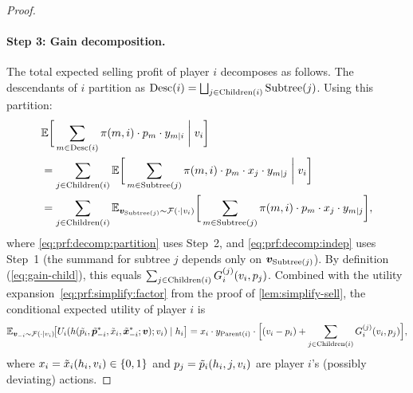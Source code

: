 \begin{proof}
\paragraph{Step 3: Gain decomposition.}
The total expected selling profit of player $i$ decomposes as follows. The descendants of $i$ partition as $\operatorname{Desc}(i) = \bigsqcup_{j \in \operatorname{Children}(i)} \operatorname{Subtree}(j)$. Using this partition:
\begin{align}
&\mathbb{E}\bigg[\sum_{m \in \operatorname{Desc}(i)} \pi(m,i) \cdot p_m \cdot y_{m \mid i} \;\bigg|\; v_i\bigg] \nonumber\\
&= \sum_{j \in \operatorname{Children}(i)} \mathbb{E}\bigg[\sum_{m \in \operatorname{Subtree}(j)} \pi(m,i) \cdot p_m \cdot x_j \cdot y_{m \mid j} \;\bigg|\; v_i\bigg] \label{eq:prf:decomp:partition}\\
&= \sum_{j \in \operatorname{Children}(i)} \mathbb{E}_{{\bm{v}}_{\operatorname{Subtree}(j)} \sim \mathcal{F}(\cdot | v_i)}\bigg[\sum_{m \in \operatorname{Subtree}(j)} \pi(m,i) \cdot p_m \cdot x_j \cdot y_{m \mid j}\bigg], \label{eq:prf:decomp:indep}
\end{align}
where \eqref{eq:prf:decomp:partition} uses Step~2, and \eqref{eq:prf:decomp:indep} uses Step~1 (the summand for subtree $j$ depends only on ${\bm{v}}_{\operatorname{Subtree}(j)}$). By definition (\cref{eq:gain-child}), this equals $\sum_{j \in \operatorname{Children}(i)} G^{(j)}_i(v_i, p_j)$. Combined with the utility expansion~\eqref{eq:prf:simplify:factor} from the proof of \cref{lem:simplify-sell}, the conditional expected utility of player $i$ is
\begin{equation}
\label{eq:lem2:decomp}
\mathbb{E}_{{\bm{v}}_{-i} \sim \mathcal{F}(\cdot \mid v_i)}\!\big[U_i(h(\tilde{p}_i, \tilde{{\bm{p}}}^*_{-i}, \tilde{x}_i, \tilde{{\bm{x}}}^*_{-i}; {\bm{v}}); v_i) \mid h_i\big] = x_i \cdot y_{\operatorname{Parent}(i)} \cdot \Big[(v_i - p_i) + \sum_{j \in \operatorname{Children}(i)} G^{(j)}_i(v_i, p_j)\Big],
\end{equation}
where $x_i = \tilde{x}_i(h_i, v_i) \in \{0,1\}$ and $p_j = \tilde{p}_i(h_i, j, v_i)$ are player $i$'s (possibly deviating) actions.


\end{proof}
